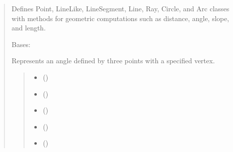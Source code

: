 \documentclass[letterpaper,10pt,english]{sphinxmanual}
\begin{document}
\begin{quote}
\sphinxAtStartPar
Defines Point, LineLike, LineSegment, Line, Ray, Circle, and Arc classes with
methods for geometric computations such as distance, angle, slope, and length.

\begin{fulllineitems}
\label{\detokenize{pygeox:pygeox.basic_objects.Angle}}
\pysigstartsignatures
\pysiglinewithargsret
{}
{\sphinxparamcomma {}\sphinxparamcomma {}\sphinxparamcomma {}\sphinxparamcomma {}\sphinxparamcomma {}}
{}
\pysigstopsignatures
\sphinxAtStartPar
Bases: 

\sphinxAtStartPar
Represents an angle defined by three points with a specified vertex.
\begin{quote}\begin{description}
\begin{itemize}
\item {} 
\sphinxAtStartPar
{} ()

\item {} 
\sphinxAtStartPar
{} ()

\item {} 
\sphinxAtStartPar
{} ()

\item {} 
\sphinxAtStartPar
{} (\sphinxstyleliteralemphasis{\sphinxupquote{ | }})

\item {} 
\sphinxAtStartPar
{} (\sphinxstyleliteralemphasis{\sphinxupquote{ | }})


\end{itemize}
\end{description}
\end{quote}
\end{fulllineitems}
\end{quote}
\end{document}
